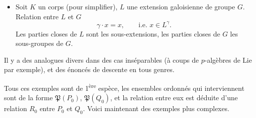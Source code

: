 \documentclass[11pt]{article}
\newcommand{\printedpage}[1]{\marginpar{\footnotesize p.~#1}}
\newcommand{\msp}[1]{\marginpar{\footnotesize [#1]}}
\newcommand{\Pf}{\mathfrak{P}}
\begin{document}
\printedpage{49}

\begin{itemize}[leftmargin=2.5em]
\item[5)] Soit $K$ un corps (pour simplifier), $L$ une extension galoisienne de groupe $G$. Relation entre $L$ et $G$
\[
\gamma\cdot x=x,\qquad \text{i.e. } x\in L^{\gamma}.
\]
Les parties closes de $L$ sont les sous-extensions, les parties closes de $G$ les sous-groupes de $G$.
\end{itemize}

Il y a des analogues divers dans des cas inséparables (à coups de $p$-algèbres de Lie par exemple), et des énoncés de descente en tous genres.

\msp{page 80}Tous ces exemples sont de 1\textsuperscript{ère} espèce, les ensembles ordonnés qui interviennent sont de la forme $\Pf(P_0)$, $\Pf(Q_0)$, et la relation entre eux est déduite d'une relation $R_0$ entre $P_0$ et $Q_0$. Voici maintenant des exemples plus complexes.
\end{document}
